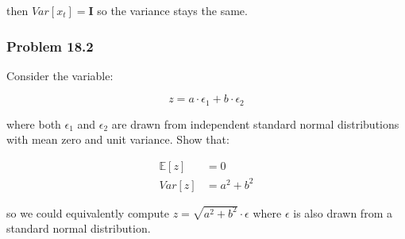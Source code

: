 \documentclass[
10pt, %
a4paper, %
oneside, %
headinclude,footinclude, %
BCOR5mm, %
]{scrartcl}
\begin{document}
then $Var[x_t] = \textbf{I}$ so the variance stays the same.

\subsubsection*{Problem 18.2}

Consider the variable:

$$z = a \cdot \epsilon_1 + b \cdot \epsilon_2$$

where both $\epsilon_1$ and $\epsilon_2$ are drawn from independent standard normal distributions with mean zero and unit variance. Show that:

\begin{align*}
  \mathbb{E}[z] &= 0 \\
  Var[z] &= a^2 + b^2
\end{align*}

so we could equivalently compute $z = \sqrt{a^2 + b^2} \cdot \epsilon$ where $\epsilon$ is also drawn from a standard normal distribution.


\end{document}
